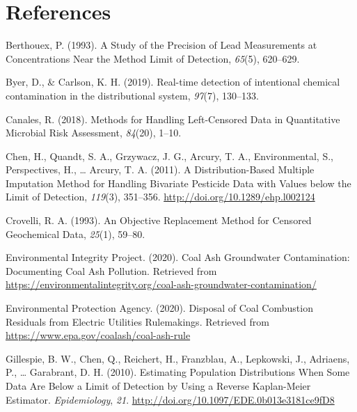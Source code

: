 \documentclass[12pt, twoside]{amherstthesis}
\newlength{\cslhangindent}
\newenvironment{cslreferences}%
  {\setlength{\parindent}{0pt}%
  \everypar{\setlength{\hangindent}{\cslhangindent}}\ignorespaces}%
  {\par}
\begin{document}
\backmatter

\hypertarget{references}{%
\chapter*{References}\label{references}}

\noindent

\setlength{\parindent}{-0.20in}
\setlength{\leftskip}{0.20in}
\setlength{\parskip}{8pt}

\hypertarget{refs}{}
\begin{cslreferences}
\leavevmode\hypertarget{ref-Berthouex1993}{}%
Berthouex, P. (1993). A Study of the Precision of Lead Measurements at Concentrations Near the Method Limit of Detection, \emph{65}(5), 620--629.

\leavevmode\hypertarget{ref-Byer2019}{}%
Byer, D., \& Carlson, K. H. (2019). Real-time detection of intentional chemical contamination in the distributional system, \emph{97}(7), 130--133.

\leavevmode\hypertarget{ref-Canales2018}{}%
Canales, R. (2018). Methods for Handling Left-Censored Data in Quantitative Microbial Risk Assessment, \emph{84}(20), 1--10.

\leavevmode\hypertarget{ref-Chen2011}{}%
Chen, H., Quandt, S. A., Grzywacz, J. G., Arcury, T. A., Environmental, S., Perspectives, H., \ldots{} Arcury, T. A. (2011). A Distribution-Based Multiple Imputation Method for Handling Bivariate Pesticide Data with Values below the Limit of Detection, \emph{119}(3), 351--356. \url{http://doi.org/10.1289/ehp.l002124}

\leavevmode\hypertarget{ref-Crovelli1993}{}%
Crovelli, R. A. (1993). An Objective Replacement Method for Censored Geochemical Data, \emph{25}(1), 59--80.

\leavevmode\hypertarget{ref-EIP2020}{}%
Environmental Integrity Project. (2020). Coal Ash Groundwater Contamination: Documenting Coal Ash Pollution. Retrieved from \url{https://environmentalintegrity.org/coal-ash-groundwater-contamination/}

\leavevmode\hypertarget{ref-Car2020}{}%
Environmental Protection Agency. (2020). Disposal of Coal Combustion Residuals from Electric Utilities Rulemakings. Retrieved from \url{https://www.epa.gov/coalash/coal-ash-rule}

\leavevmode\hypertarget{ref-Gillespie2010}{}%
Gillespie, B. W., Chen, Q., Reichert, H., Franzblau, A., Lepkowski, J., Adriaens, P., \ldots{} Garabrant, D. H. (2010). Estimating Population Distributions When Some Data Are Below a Limit of Detection by Using a Reverse Kaplan-Meier Estimator. \emph{Epidemiology}, \emph{21}. \url{http://doi.org/10.1097/EDE.0b013e3181ce9fD8}


\end{cslreferences}
\end{document}
